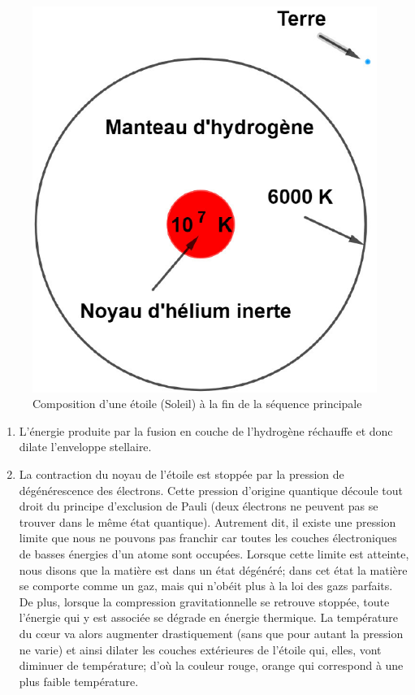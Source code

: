 \begin{figure}[H]\vspace{1cm}
	\centering
	\includegraphics[scale=0.45]{images/compo_sp}
	\caption[Composition d'une étoile (Soleil) à la fin de la séquence principale -figure réalisée avec GeoGebra]{Composition d'une étoile (Soleil) à la fin de la séquence principale}
	\label{Fig. 2.3}
\end{figure}\bigskip                         

\begin{enumerate}
	\item L’énergie produite par la fusion en couche de l’hydrogène réchauffe et donc dilate l’enveloppe stellaire.
	\item La contraction du noyau de l’étoile est stoppée par la pression de dégénérescence des électrons. Cette pression d’origine quantique découle tout droit du principe d’exclusion de Pauli (deux électrons ne peuvent pas se trouver dans le même état quantique). Autrement dit, il existe une pression limite que nous ne pouvons pas franchir car toutes les couches électroniques de basses énergies d’un atome sont occupées. Lorsque cette limite est atteinte, nous disons que la matière est dans un état dégénéré; dans cet état la matière se comporte comme un gaz, mais qui n'obéit plus à la loi des gazs parfaits. De plus, lorsque la compression gravitationnelle se retrouve stoppée, toute l'énergie qui y est associée se dégrade en énergie thermique. La température du cœur va alors augmenter drastiquement (sans que pour autant la pression ne varie) et ainsi dilater les couches extérieures de l’étoile qui, elles, vont diminuer de température; d’où la couleur rouge, orange qui correspond à une plus faible température. 
	
\end{enumerate}

